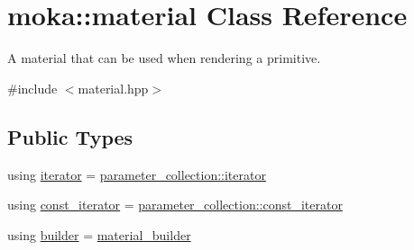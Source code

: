 \hypertarget{classmoka_1_1material}{}\section{moka\+::material Class Reference}
\label{classmoka_1_1material}


A material that can be used when rendering a primitive.  




{\ttfamily \#include $<$material.\+hpp$>$}

\subsection*{Public Types}
\begin{DoxyCompactItemize}
\item 
using \mbox{\hyperlink{classmoka_1_1material_ac6839c8e1a338dbaef539569388f89e5}{iterator}} = \mbox{\hyperlink{classmoka_1_1parameter__collection_a2ec8bed3c1d7de9e5c2199ede27aa919}{parameter\+\_\+collection\+::iterator}}
\item 
using \mbox{\hyperlink{classmoka_1_1material_ab87ba893c5a7741e95718b0bddbc1049}{const\+\_\+iterator}} = \mbox{\hyperlink{classmoka_1_1parameter__collection_a6d2ad87d4e43742300cb9ded3beee731}{parameter\+\_\+collection\+::const\+\_\+iterator}}
\item 
using \mbox{\hyperlink{classmoka_1_1material_a7dd1fd24e083df29846cf501ea85a1cb}{builder}} = \mbox{\hyperlink{classmoka_1_1material__builder}{material\+\_\+builder}}
\end{DoxyCompactItemize}
